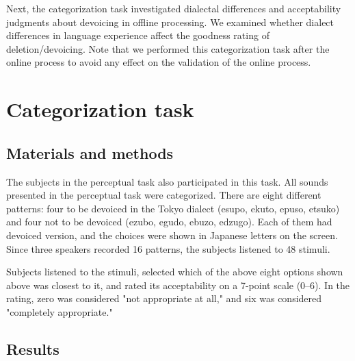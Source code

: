 \documentclass[a4paper,11pt,twocolumn]{article}
\begin{document}
Next, the categorization task investigated dialectal differences and acceptability judgments about devoicing in offline processing. We examined whether dialect differences in language experience affect the goodness rating of deletion/devoicing. Note that we performed this categorization task after the online process to avoid any effect on the validation of the online process.

\section{Categorization task}

\subsection{Materials and methods}

The subjects in the perceptual task also participated in this task. All sounds presented in the perceptual task were categorized. There are eight different patterns: four to be devoiced in the Tokyo dialect (esupo, ekuto, epuso, etsuko) and four not to be devoiced (ezubo, egudo, ebuzo, edzugo). Each of them had devoiced version, and the choices were shown in Japanese letters on the screen. Since three speakers recorded 16 patterns, the subjects listened to 48 stimuli.

Subjects listened to the stimuli, selected which of the above eight options shown above was closest to it, and rated its acceptability on a 7-point scale (0--6). In the rating, zero was considered "not appropriate at all," and six was considered "completely appropriate."

\subsection{Results}
\end{document}

